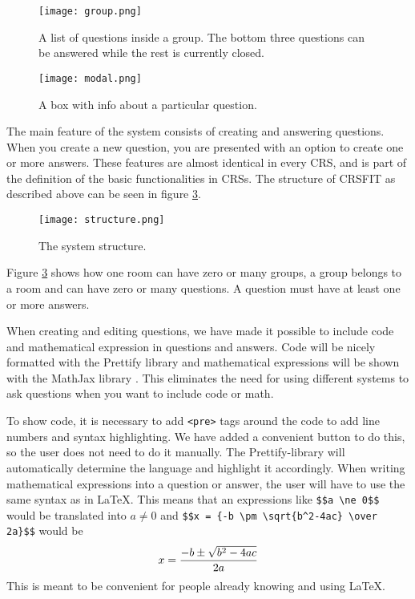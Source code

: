 \begin{figure}[H]
\capstart
	\centering
		\texttt{[image: group.png]}
	\caption[Inside a group]{A list of questions inside a group. The bottom three questions can be answered while the rest is currently closed.}\label{fig:group}
\end{figure}

\begin{figure}[H]
\capstart
	\centering
		\texttt{[image: modal.png]}
	\caption[Info box]{A box with info about a particular question.}\label{fig:modal}
\end{figure}

The main feature of the system consists of creating and answering questions. When you create a new question, you are presented with an option to create one or more answers.
These features are almost identical in every CRS, and is part of the definition of the basic functionalities in CRSs. 
The structure of CRSFIT as described above can be seen in figure \ref{fig:structure}.

\begin{figure}[H]
\capstart
	\centering
		\texttt{[image: structure.png]}
	\caption[System structure]{The system structure.}\label{fig:structure}
\end{figure}

Figure \ref{fig:structure} shows how one room can have zero or many groups, a group belongs to a room and can have zero or many questions. A question must have at least one or more answers.

When creating and editing questions, we have made it possible to include code and mathematical expression in questions and answers. Code will be nicely formatted with the Prettify library \cite{google/code-prettify_2016} and mathematical expressions will be shown with the MathJax library \cite{mathjax_2016}. This eliminates the need for using different systems to ask questions when you want to include code or math. 

To show code, it is necessary to add \texttt{<pre>} tags around the code to add line numbers and syntax highlighting. We have added a convenient button to do this, so the user does not need to do it manually. The Prettify-library will automatically determine the language and highlight it accordingly. When writing mathematical expressions into a question or answer, the user will have to use the same syntax as in \LaTeX. This means that an expressions like \verb|$$a \ne 0$$| would be translated into $a \ne 0$ and \verb|$$x = {-b \pm \sqrt{b^2-4ac} \over 2a}$$| would be 
$$x = {-b \pm \sqrt{b^2-4ac} \over 2a}$$
This is meant to be convenient for people already knowing and using \LaTeX.

